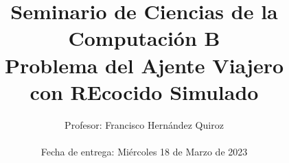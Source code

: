 \documentclass[a4paper]{article}
\title {\textbf {\Large{Seminario de Ciencias de la Computaci\'on B}}\protect\\
  \large{\textbf{Problema del Ajente Viajero\\con REcocido Simulado}}}
\date{}
\author{\normalsize{Profesor: Francisco Hern\'andez Quiroz}\protect\\ \vspace{0.2cm}


  \vspace{0.6cm}
  \normalsize{{Fecha de entrega: Mi\'ercoles 18 de Marzo de 2023}} \protect\\ \vspace{0.62cm}
  \normalsize }
\begin{document}
\allowdisplaybreaks
\maketitle
\end{document}
